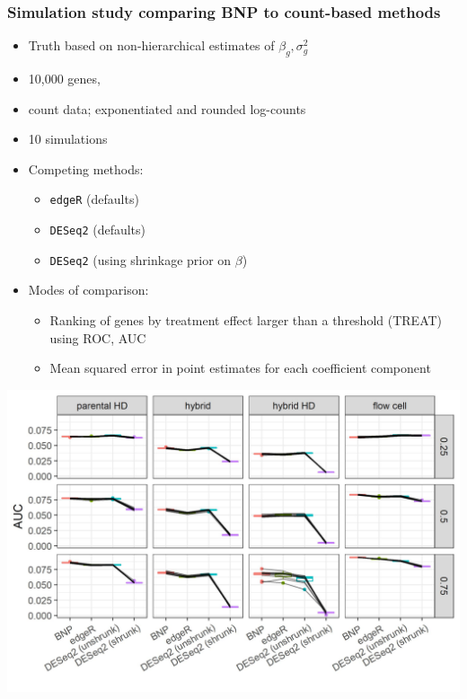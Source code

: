 \documentclass{beamer}
\begin{document}
\begin{frame}
  \frametitle{Simulation study comparing BNP to count-based methods}
  \begin{itemize}
    \item Truth based on non-hierarchical estimates of $\beta_g,\sigma^2_g$
    \item 10,000 genes,
    \item count data; exponentiated and rounded log-counts
    \item 10 simulations
    \pause\item Competing methods:
    \begin{itemize}
      \pause\item \texttt{edgeR} (defaults) \citep{edger2010}
      \pause\item \texttt{DESeq2} (defaults) \citep{deseq2014}
      \pause\item \texttt{DESeq2} (using shrinkage prior on $\beta$)
    \end{itemize}
    \pause\item Modes of comparison:
    \begin{itemize}
      \pause\item Ranking of genes by treatment effect larger than a threshold (TREAT) using ROC, AUC
      \pause\item Mean squared error in point estimates for each coefficient component
    \end{itemize}
  \end{itemize}
\end{frame}

\begin{frame}%
  \includegraphics[width=\textwidth]{aud-ss2}
\end{frame}
\end{document}
